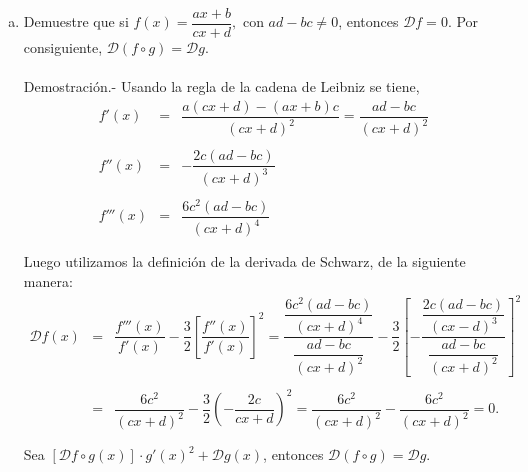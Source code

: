 \begin{enumerate}[\bfseries 1.]
\begin{enumerate}[(a)]
	     \item Demuestre que si $f(x)=\dfrac{ax+b}{cx+d},$ con $ad-bc\neq 0$, entonces $\mathscr{D}f=0.$ Por consiguiente, $\mathscr{D}(f\circ g)=\mathscr{D}g.$\\\\
		 Demostración.-\; Usando la regla de la cadena de Leibniz se tiene,
		 $$\begin{array}{rcl}
		     f'(x)&=&\dfrac{a(cx+d)-(ax+b)c}{(cx+d)^2} = \dfrac{ad-bc}{(cx+d)^2}\\\\
		     f''(x)&=&-\dfrac{2c(ad-bc)}{(cx+d)^3}\\\\
		     f'''(x)&=&\dfrac{6c^2(ad-bc)}{(cx+d)^4}\\\\
		 \end{array}$$
		 Luego utilizamos la definición de la derivada de Schwarz, de la siguiente manera:
		 $$\begin{array}{rcl}
		     \mathscr{D}f(x)&=&\dfrac{f'''(x)}{f'(x)}-\dfrac{3}{2}\left[\dfrac{f''(x)}{f'(x)}\right]^2=\dfrac{\dfrac{6c^2(ad-bc)}{(cx+d)^4}}{\dfrac{ad-bc}{(cx+d)^2}}-\dfrac{3}{2}\left[-\dfrac{\dfrac{2c(ad-bc)}{(cx-d)^3}}{\dfrac{ad-bc}{(cx+d)^2}}\right]^2\\\\
				    &=&\dfrac{6c^2}{(cx+d)^2}-\dfrac{3}{2}\left(-\dfrac{2c}{cx+d}\right)^2=\dfrac{6c^2}{(cx+d)^2}-\dfrac{6c^2}{(cx+d)^2}=0.\\\\
		 \end{array}$$
		 Sea $\left[\mathscr{D}f\circ g(x)\right]\cdot g'(x)^2+\mathscr{D}g(x)$, entonces $\mathscr{D}(f\circ g)=\mathscr{D}g.$\\\\

	 \end{enumerate}


\end{enumerate}
